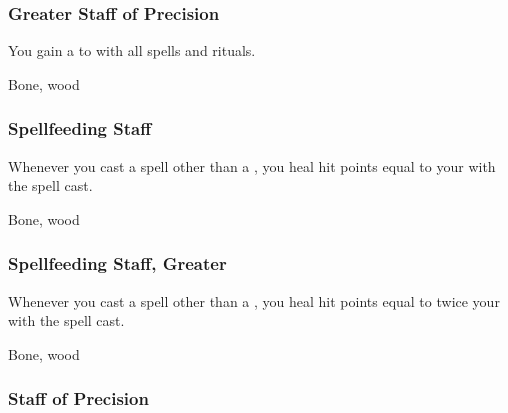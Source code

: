
\lowercase{\hypertarget{item:Greater Staff of Precision}{}}\label{item:Greater Staff of Precision}
\hypertarget{item:Greater Staff of Precision}{\subsubsection{Greater Staff of Precision\hfill{}}}

You gain a   to  with all spells and rituals.



 


 Bone, wood


\lowercase{\hypertarget{item:Spellfeeding Staff}{}}\label{item:Spellfeeding Staff}
\hypertarget{item:Spellfeeding Staff}{\subsubsection{Spellfeeding Staff\hfill{}}}

Whenever you cast a spell other than a , you heal hit points equal to your  with the spell cast.



 


 Bone, wood


\lowercase{\hypertarget{item:Spellfeeding Staff, Greater}{}}\label{item:Spellfeeding Staff, Greater}
\hypertarget{item:Spellfeeding Staff, Greater}{\subsubsection{Spellfeeding Staff, Greater\hfill{}}}

Whenever you cast a spell other than a , you heal hit points equal to twice your  with the spell cast.



 


 Bone, wood


\lowercase{\hypertarget{item:Staff of Precision}{}}\label{item:Staff of Precision}
\hypertarget{item:Staff of Precision}{\subsubsection{Staff of Precision\hfill{}}}

